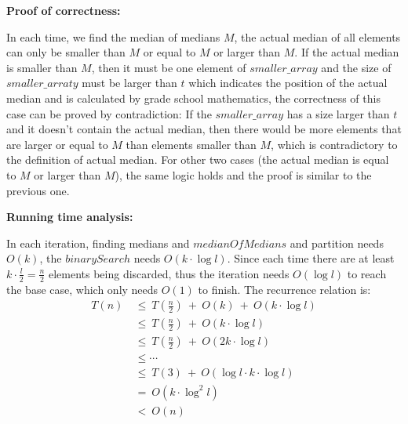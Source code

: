 \documentclass{article}
\begin{document}
{\par\textbf{Proof of correctness: }
\par In each time, we find the median of medians $M$, the actual median of all elements can only be smaller than $M$ or equal to $M$ or larger than $M$. If the actual median is smaller than $M$, then it must be one element of $smaller\_array$ and the size of $smaller\_arraty$ must be larger than $t$ which indicates the position of the actual median and is calculated by grade school mathematics, the correctness of this case can be proved by contradiction: If the $smaller\_array$ has a size larger than $t$ and it doesn't contain the actual median, then there would be more elements that are larger or equal to $M$ than elements smaller than $M$, which is contradictory to the definition of actual median. For other two cases (the actual median is equal to $M$ or larger than $M$), the same logic holds and the proof is similar to the previous one.\\

\par\textbf{Running time analysis: }
\par In each iteration, finding medians and $medianOfMedians$ and partition needs $O(k)$, the $binarySearch$ needs $O(k\cdot \log l)$. Since each time there are at least $k\cdot \frac{l}{2} = \frac{n}{2}$ elements being discarded, thus the iteration needs $O(\log l)$ to reach the base case, which only needs $O(1)$ to finish. The recurrence relation is:
\begin{align*}
	T(n)\ &\leq\ T(\frac{n}{2})\ +\ O(k)\ +\ O(k\cdot \log l)\\
		   &\leq\ T(\frac{n}{2})\ +\ O(k\cdot \log l)\\
		   &\leq\ T(\frac{n}{2})\ +\ O(2k\cdot \log l)\\
		   &\leq\cdots\\
		   &\leq\ T(3)\ +\ O(\log l\cdot k\cdot \log l)\\
		   &=\ O(k\cdot \log^2 l)\\
		   &<\ O(n)
\end{align*}
}
\end{document}
